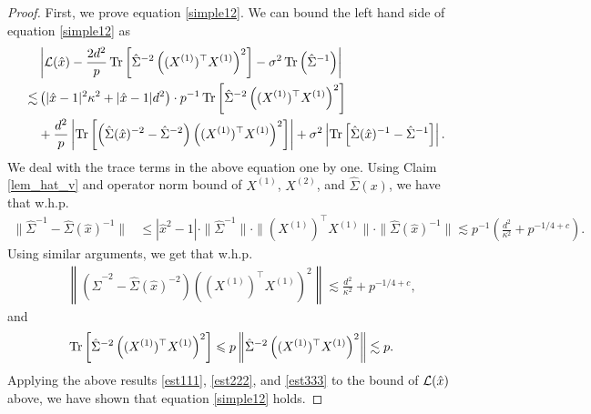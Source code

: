 \begin{proof}
First, we prove equation \eqref{simple12}.
We can bound the left hand side of equation \eqref{simple12} as
\begin{align*}
	&\left|\mathcal L(\hat x)-\frac{2d^2}{p}\operatorname{Tr}\left[\hat\Sigma^{-2} \left((X^{(1)})^\top X^{(1)} \right)^2\right] -\sigma^2  \operatorname{Tr}\left({\hat\Sigma^{-1}  }\right)\right| \\
	\lesssim &\left(|\hat x-1|^2 \kappa^2 + |\hat x-1|d^2\right)\cdot p^{-1}\operatorname{Tr}\left[ \hat\Sigma^{-2} \left((X^{(1)})^{\top}X^{(1)}\right)^2 \right] \\
	&+ \frac{d^2}{p}\left|\operatorname{Tr}\left[\left(\hat\Sigma(\hat x)^{-2}-\hat\Sigma^{-2}\right) \left((X^{(1)})^\top X^{(1)} \right)^2\right]\right|+ \sigma^2  \left|\operatorname{Tr}\left[\hat\Sigma(\hat x)^{-1}-\hat\Sigma^{-1}  \right]\right|.
\end{align*}
We deal with the trace terms in the above equation one by one.
Using Claim \ref{lem_hat_v} and operator norm bound of $X^{(1)}$, $X^{(2)}$, and $\hat{\Sigma}(x)$, we have that w.h.p.
\begin{align}
	\|\hat\Sigma^{-1}-\hat\Sigma(\hat x)^{-1}\| &\le |\hat x^2-1| \cdot \|\hat\Sigma^{-1}\| \cdot \| (X^{(1)})^\top X^{(1)}\| \cdot \|\hat\Sigma(\hat x)^{-1}\|  \lesssim p^{-1}\left(\frac{d^2}{\kappa^2} + p^{-1/4+c}\right).\label{est111}
\end{align}
Using similar arguments, we get that w.h.p.
\begin{align}\label{est222}
&\left\|\left(\hat\Sigma^{-2}-\hat\Sigma(\hat x)^{-2}\right)\left((X^{(1)})^\top X^{(1)} \right)^2\right\| \lesssim  \frac{d^2}{\kappa^2} + p^{-1/4+c},
\end{align}
and
\begin{align}
& \operatorname{Tr}\left[ \hat\Sigma^{-2} \left((X^{(1)})^{\top}X^{(1)}\right)^2\right]  \leqslant p \left\| \hat\Sigma^{-2} \left((X^{(1)})^{\top}X^{(1)}\right)^2 \right\|\lesssim p.\label{est333}
\end{align}
Applying the above results \eqref{est111}, \eqref{est222}, and \eqref{est333} to the bound of $\mathcal{L}(\hat{x})$ above, we have shown that equation \eqref{simple12} holds.


\end{proof}

